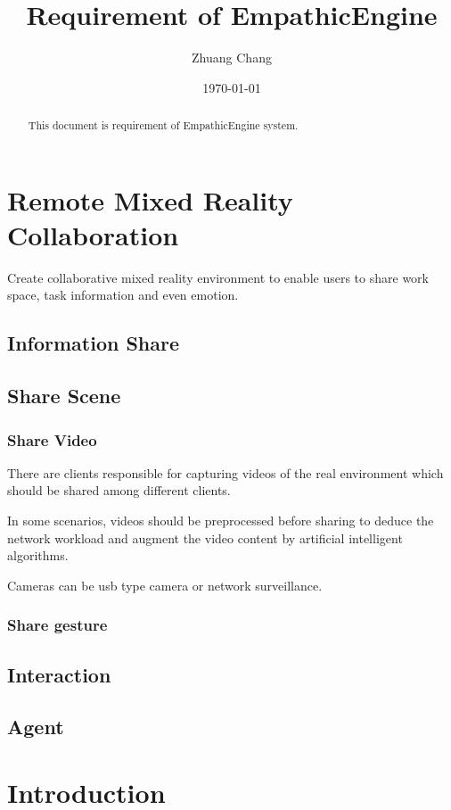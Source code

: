 \documentclass{article}
\begin{document}
\title{Requirement of EmpathicEngine}
\author{Zhuang Chang}
\date{\today}

\maketitle

\begin{abstract}
This document is requirement of EmpathicEngine system.
\end{abstract}

\tableofcontents

\section{Remote Mixed Reality Collaboration}
Create collaborative mixed reality environment to enable users to share work space, task information and even emotion.
\subsection{Information Share}
\subsection{Share Scene}
\subsubsection{Share Video}
There are clients responsible for capturing videos of the real environment which should be shared among different clients.

In some scenarios, videos should be preprocessed before sharing to deduce the network workload and augment the video content by artificial intelligent algorithms.

Cameras can be usb type camera or network surveillance.
\subsubsection{Share gesture}
\subsection{Interaction}
\subsection{Agent}
\section{Introduction}
\end{document}
